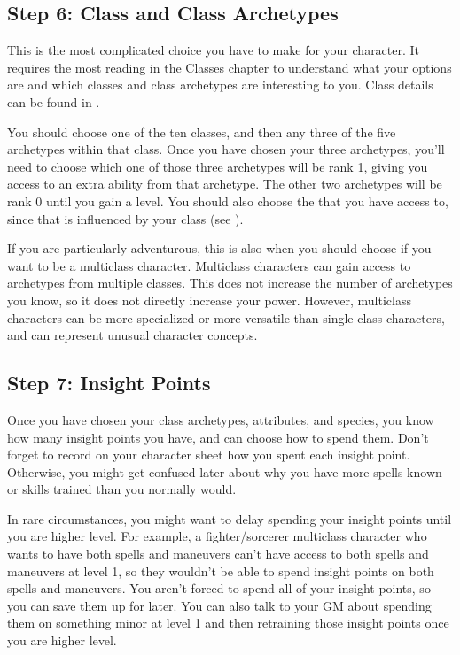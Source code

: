     \subsection{Step 6: Class and Class Archetypes}
        This is the most complicated choice you have to make for your character.
        It requires the most reading in the Classes chapter to understand what your options are and which classes and class archetypes are interesting to you.
        Class details can be found in .

        You should choose one of the ten classes, and then any three of the five archetypes within that class.
        Once you have chosen your three archetypes, you'll need to choose which one of those three archetypes will be rank 1, giving you access to an extra ability from that archetype.
        The other two archetypes will be rank 0 until you gain a level.
        You should also choose the  that you have access to, since that is influenced by your class (see ).

        If you are particularly adventurous, this is also when you should choose if you want to be a multiclass character.
        Multiclass characters can gain access to archetypes from multiple classes.
        This does not increase the number of archetypes you know, so it does not directly increase your power.
        However, multiclass characters can be more specialized or more versatile than single-class characters, and can represent unusual character concepts.

    \subsection{Step 7: Insight Points}
        Once you have chosen your class archetypes, attributes, and species, you know how many insight points you have, and can choose how to spend them.
        Don't forget to record on your character sheet how you spent each insight point.
        Otherwise, you might get confused later about why you have more spells known or skills trained than you normally would.

        In rare circumstances, you might want to delay spending your insight points until you are higher level.
        For example, a fighter/sorcerer multiclass character who wants to have both spells and maneuvers can't have access to both spells and maneuvers at level 1, so they wouldn't be able to spend insight points on both spells and maneuvers.
        You aren't forced to spend all of your insight points, so you can save them up for later.
        You can also talk to your GM about spending them on something minor at level 1 and then retraining those insight points once you are higher level.

